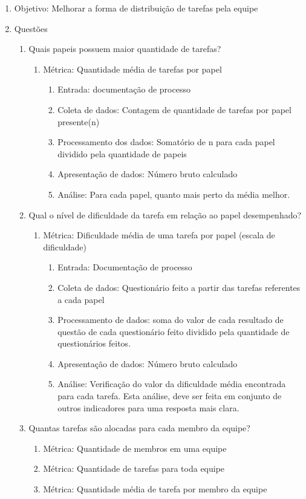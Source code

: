 \documentclass{article}
\begin{document}
	\begin{enumerate}
	\item Objetivo: Melhorar a forma de distribuição de tarefas pela equipe
	\item Questões
		\begin{enumerate}
		\item Quais papeis possuem maior quantidade de tarefas?
			\begin{enumerate}
			\item Métrica: Quantidade média de tarefas por papel
				\begin{enumerate}
				
				\item Entrada: documentação de processo
				\item Coleta de dados: Contagem de quantidade de tarefas por papel presente(n)
				\item Processamento dos dados: Somatório de n para cada papel dividido pela quantidade de papeis
				\item Apresentação de dados: Número bruto calculado
				\item Análise: Para cada papel, quanto mais perto da média melhor.
				
				\end{enumerate}
			\end{enumerate}
		\item Qual o nível de dificuldade da tarefa em relação ao papel desempenhado?
			\begin{enumerate}
			\item Métrica: Dificuldade média de uma tarefa por papel (escala de dificuldade)
				\begin{enumerate}
				\item Entrada: Documentação de processo
				\item Coleta de dados: Questionário feito a partir das tarefas referentes a cada papel
				\item Processamento de dados: soma do valor de cada resultado de questão de cada questionário feito dividido pela quantidade de questionários feitos.
				\item Apresentação de dados: Número bruto calculado
				\item Análise: Verificação do valor da dificuldade média encontrada para cada tarefa. Esta análise, deve ser feita em conjunto de outros indicadores para uma resposta mais clara.
				  
				\end{enumerate}
			\end{enumerate}
		\item Quantas tarefas são alocadas para cada membro da equipe?
			\begin{enumerate}
			\item Métrica: Quantidade de membros em uma equipe
			\item Métrica: Quantidade de tarefas para toda equipe
			\item Métrica: Quantidade média de tarefa por membro da equipe
			\end{enumerate}
		\end{enumerate}
	\end{enumerate}
\end{document}
